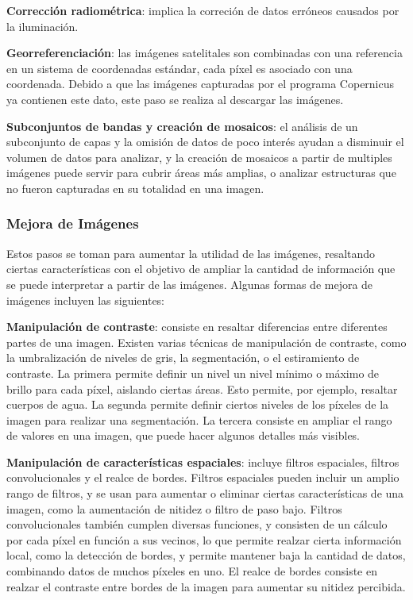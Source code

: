 
{\bf Corrección radiométrica}: implica la correción de datos erróneos causados por la iluminación.


{\bf Georreferenciación}: las imágenes satelitales son combinadas con una referencia en un sistema de coordenadas
estándar, cada píxel es asociado con una coordenada. Debido a que las imágenes capturadas por el programa Copernicus ya
contienen este dato, este paso se realiza al descargar las imágenes.

{\bf Subconjuntos de bandas y creación de mosaicos}: el análisis de un subconjunto de capas y la omisión de datos de
poco interés ayudan a disminuir el volumen de datos para analizar, y la creación de mosaicos a partir de multiples
imágenes puede servir para cubrir áreas más amplias, o analizar estructuras que no fueron capturadas en su totalidad en
una imagen.

\subsubsection{Mejora de Imágenes}

Estos pasos se toman para aumentar la utilidad de las imágenes, resaltando ciertas características con el objetivo de
ampliar la cantidad de información que se puede interpretar a partir de las imágenes. Algunas formas de mejora de
imágenes incluyen las siguientes:

{\bf Manipulación de contraste}: consiste en resaltar diferencias entre diferentes partes de una imagen. Existen varias
técnicas de manipulación de contraste, como la umbralización de niveles de gris, la segmentación, o el estiramiento de
contraste. La primera permite definir un nivel un nivel mínimo o máximo de brillo para cada píxel, aislando ciertas
áreas. Esto permite, por ejemplo, resaltar cuerpos de agua. La segunda permite definir ciertos niveles de los píxeles
de la imagen para realizar una segmentación. La tercera consiste en ampliar el rango de valores en una imagen, que
puede hacer algunos detalles más visibles.

{\bf Manipulación de características espaciales}: incluye filtros espaciales, filtros convolucionales y el realce de
bordes. Filtros espaciales pueden incluir un amplio rango de filtros, y se usan para aumentar o eliminar ciertas
características de una imagen, como la aumentación de nitidez o filtro de paso bajo. Filtros convolucionales también
cumplen diversas funciones, y consisten de un cálculo por cada píxel en función a sus vecinos, lo que permite realzar
cierta información local, como la detección de bordes, y permite mantener baja la cantidad de datos, combinando datos
de muchos píxeles en uno. El realce de bordes consiste en realzar el contraste entre bordes de la imagen para aumentar
su nitidez percibida.

